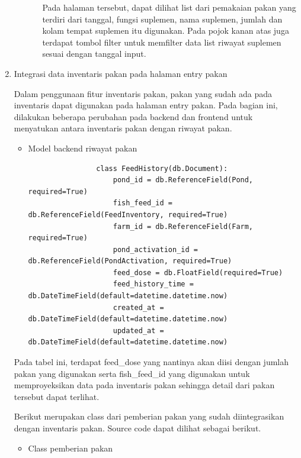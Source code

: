 \begin{spacing}{1.5}
\begin{enumerate}
\begin{enumerate}
\begin{itemize}
				Pada halaman tersebut, dapat dilihat list dari pemakaian pakan yang terdiri dari tanggal, fungsi suplemen, nama suplemen, jumlah dan kolam tempat suplemen itu digunakan. Pada pojok kanan atas juga terdapat tombol filter untuk memfilter data list riwayat suplemen sesuai dengan tanggal input.

				\end{itemize}
		\end{enumerate}
		
		\item Integrasi data inventaris pakan pada halaman entry pakan
		
		Dalam penggunaan fitur inventaris pakan, pakan yang sudah ada pada inventaris dapat digunakan pada halaman entry pakan. Pada bagian ini, dilakukan beberapa perubahan pada backend dan frontend untuk menyatukan antara inventaris pakan dengan riwayat pakan.

		\begin{itemize}
			\item Model backend riwayat pakan
			
			\begin{lstlisting}
				class FeedHistory(db.Document):
					pond_id = db.ReferenceField(Pond, required=True)
					fish_feed_id = db.ReferenceField(FeedInventory, required=True)
					farm_id = db.ReferenceField(Farm, required=True)
					pond_activation_id = db.ReferenceField(PondActivation, required=True)
					feed_dose = db.FloatField(required=True)
					feed_history_time = db.DateTimeField(default=datetime.datetime.now)
					created_at = db.DateTimeField(default=datetime.datetime.now)
					updated_at = db.DateTimeField(default=datetime.datetime.now)
			\end{lstlisting}
		\end{itemize}

		Pada tabel ini, terdapat feed\_dose yang nantinya akan diisi dengan jumlah pakan yang digunakan serta fish\_feed\_id yang digunakan untuk memproyeksikan data pada inventaris pakan sehingga detail dari pakan tersebut dapat terlihat.

		Berikut merupakan class dari pemberian pakan yang sudah diintegrasikan dengan inventaris pakan. Source code dapat dilihat sebagai berikut.
		
		\begin{itemize}
			\item Class pemberian pakan
			

\end{itemize}
\end{enumerate}
\end{spacing}
